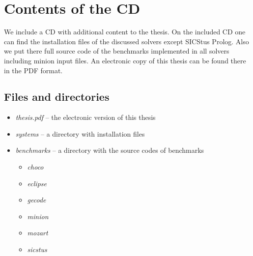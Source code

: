 \chapter{Contents of the CD}
\label{cdcontents}

We include a CD with additional content to the thesis. On the included CD one can 
find the installation files of the discussed solvers except SICStus Prolog. Also we 
put there full source code of the benchmarks implemented in all solvers including minion input files.
An electronic copy of this thesis can be found there in the PDF format.

\section{Files and directories}
\begin{itemize}
  \item {\em thesis.pdf} -- the electronic version of this thesis
  \item {\em systems} -- a directory with installation files
  \item {\em benchmarks} -- a directory with the source codes of benchmarks
  \begin{itemize}
    \item {\em choco} 
    \item {\em eclipse}
    \item {\em gecode}
    \item {\em minion}
    \item {\em mozart}
    \item {\em sicstus}
  \end{itemize}
    
\end{itemize}
  